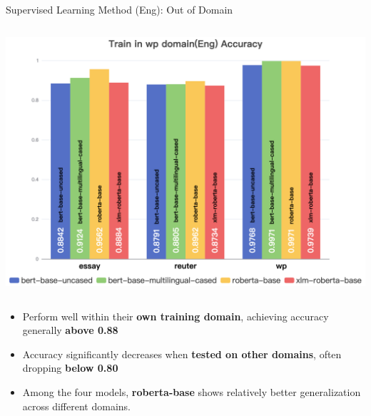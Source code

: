 \documentclass[serif]{beamer}
\begin{document}
\begin{frame}{Supervised Learning Method (Eng): Out of Domain}
\begin{columns}[t]
    \centering
    \includegraphics[width=\linewidth]{images/Train in wp domain(Eng) Accuracy.png}
\end{columns}

\begin{itemize}
    \item Perform well within their \textbf{own training domain}, achieving accuracy generally \textbf{above 0.88}
    \item Accuracy significantly decreases when \textbf{tested on other domains}, often dropping \textbf{below 0.80}
    \item Among the four models, \textbf{roberta-base} shows relatively better generalization across different domains.
    
\end{itemize}

\end{frame}
\end{document}
